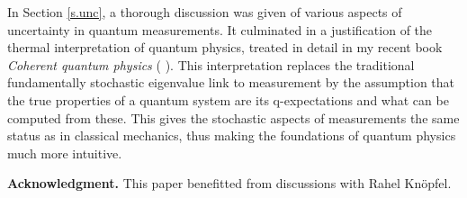 \documentclass[12pt]{article}
\begin{document}
In Section \ref{s.unc}, a thorough discussion was given of various 
aspects of uncertainty in quantum measurements. It culminated in a 
justification of the thermal interpretation of quantum physics, treated 
in detail in my recent book {\em Coherent quantum physics} 
( \cite{Neu.CQP}). This interpretation replaces the 
traditional fundamentally stochastic eigenvalue link to measurement by 
the assumption that the true properties of a quantum system are its 
q-expectations and what can be computed from these. This gives the 
stochastic aspects of measurements the same status as in classical 
mechanics, thus making the foundations of quantum physics much more 
intuitive. 

\bigskip
{\bf Acknowledgment.}
This paper benefitted from discussions with Rahel Kn\"opfel.












\bigskip
\end{document}
